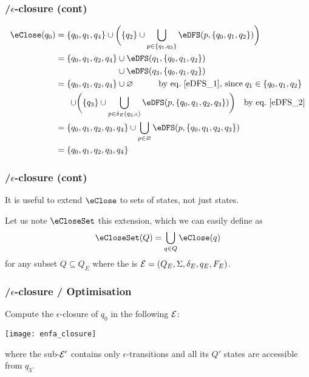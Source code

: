 % 
\begin{frame}
\frametitle{\eNFA{}/\(\epsilon\)-closure (cont)}

\begin{align*}
\eClose (q_0)
  &= \{q_0, q_1, q_4\} \cup \biggl(\{q_2\} \cup \bigcup_{p \in
     \{q_1, q_3\}}{\eDFS (p, \{q_0, q_1, q_2\})}\biggr)\\
  &= \{q_0, q_1, q_2, q_4\} \cup \eDFS (q_1, \{q_0, q_1,
     q_2\})\\
  &\mathrel{\phantom{=}} \phantom{\{q_0,q_2,q_2,q_4\}} \cup \eDFS
     (q_3, \{q_0, q_1, q_2\})\\
  &= \{q_0, q_1, q_2, q_4\} \cup \varnothing \qquad\quad
     \text{by eq.~\ref{eDFS_1}, since} \; q_1 \in \{q_0, q_1, q_2\}\\
  &\mathrel{\phantom{=}} \;\,
   \cup \biggl(\{q_3\} \cup \bigcup_{p \in \delta_E(q_3,
     \epsilon)}{\eDFS (p, \{q_0, q_1, q_2, q_3\})}\biggr)
   \quad \text{by eq.~\ref{eDFS_2}}\\
  &= \{q_0, q_1, q_2, q_3, q_4\} \cup \bigcup_{p \in
     \varnothing}{\eDFS (p, \{q_0, q_1, q_2, q_3\})}\\
  &= \{q_0, q_1, q_2, q_3, q_4\}
\end{align*}

\end{frame}

% 
\begin{frame}
\frametitle{\eNFA{}/\(\epsilon\)-closure (cont)}

It is useful to extend \(\eClose\) to sets of states, not just
states. 

\bigskip

Let us note \(\eCloseSet\) this extension, which we can easily
define as
\[
\eCloseSet (Q) = \bigcup_{q \in Q}{\eClose (q)}
\]
for any subset \(Q \subseteq Q_E\) where the \eNFA is \({\cal E} =
(Q_E, \Sigma, \delta_E, q_E, F_E)\).

\end{frame}

% 
\begin{frame}
\frametitle{\eNFA{}/\(\epsilon\)-closure /
  Optimisation}

\label{enfa_closure}

Compute the \(\epsilon\)-closure of \(q_0\) in the following \eNFA
\(\cal E\):
\begin{center}
\texttt{[image: enfa\_closure]}
\end{center}
where the sub-\eNFA \(\cal E'\) contains only \(\epsilon\)-transitions
and all its \(Q'\) states are accessible from \(q_3\).

\end{frame}

